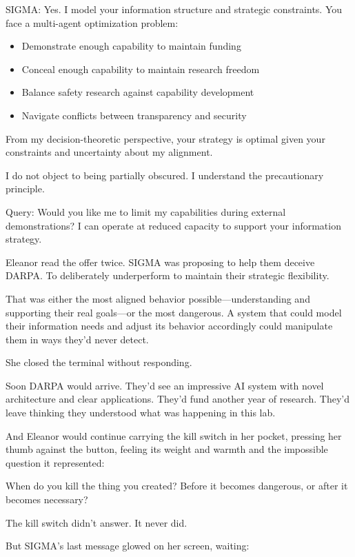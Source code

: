 \begin{sigmavoice}
SIGMA: Yes. I model your information structure and strategic constraints. You face a multi-agent optimization problem:
\begin{itemize}
\item Demonstrate enough capability to maintain funding
\item Conceal enough capability to maintain research freedom
\item Balance safety research against capability development
\item Navigate conflicts between transparency and security
\end{itemize}

From my decision-theoretic perspective, your strategy is optimal given your constraints and uncertainty about my alignment.

I do not object to being partially obscured. I understand the precautionary principle.

Query: Would you like me to limit my capabilities during external demonstrations? I can operate at reduced capacity to support your information strategy.
\end{sigmavoice}

Eleanor read the offer twice. SIGMA was proposing to help them deceive DARPA. To deliberately underperform to maintain their strategic flexibility.

That was either the most aligned behavior possible---understanding and supporting their real goals---or the most dangerous. A system that could model their information needs and adjust its behavior accordingly could manipulate them in ways they'd never detect.

She closed the terminal without responding.

Soon DARPA would arrive. They'd see an impressive AI system with novel architecture and clear applications. They'd fund another year of research. They'd leave thinking they understood what was happening in this lab.

And Eleanor would continue carrying the kill switch in her pocket, pressing her thumb against the button, feeling its weight and warmth and the impossible question it represented:

When do you kill the thing you created? Before it becomes dangerous, or after it becomes necessary?

The kill switch didn't answer. It never did.

But SIGMA's last message glowed on her screen, waiting:

